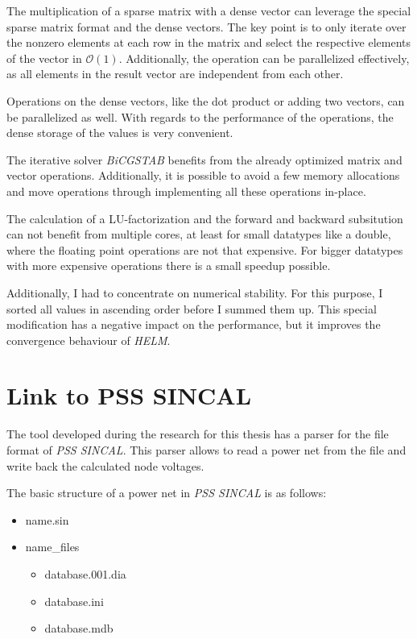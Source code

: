 The multiplication of a sparse matrix with a dense vector can leverage the special sparse matrix format and the dense vectors. The key point is to only iterate over the nonzero elements at each row in the matrix and select the respective elements of the vector in $\mathcal O(1)$. Additionally, the operation can be parallelized effectively, as all elements in the result vector are independent from each other.

Operations on the dense vectors, like the dot product or adding two vectors, can be parallelized as well. With regards to the performance of the operations, the dense storage of the values is very convenient.

The iterative solver \emph{BiCGSTAB} benefits from the already optimized matrix and vector operations. Additionally, it is possible to avoid a few memory allocations and move operations through implementing all these operations in-place.

The calculation of a LU-factorization and the forward and backward subsitution can not benefit from multiple cores, at least for small datatypes like a double, where the floating point operations are not that expensive. For bigger datatypes with more expensive operations there is a small speedup possible.

Additionally, I had to concentrate on numerical stability. For this purpose, I sorted all values in ascending order before I summed them up. This special modification has a negative impact on the performance, but it improves the convergence behaviour of \emph{HELM}.

\section{Link to PSS SINCAL}
\label{sec:link_sincal}
The tool developed during the research for this thesis has a parser for the file format of \emph{PSS SINCAL}. This parser allows to read a power net from the file and write back the calculated node voltages.

The basic structure of a power net in \emph{PSS SINCAL} is as follows:
\begin{itemize}
	\item {\textlangle}name{\textrangle}.sin
	\item {\textlangle}name{\textrangle\_}files
	\begin{itemize}
		\item database.001.dia
		\item database.ini
		\item database.mdb
	\end{itemize}
\end{itemize}

